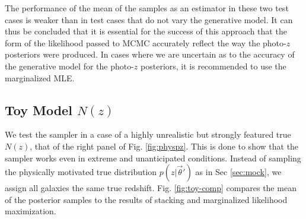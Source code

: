\documentclass[preprint]{aastex}
\begin{document}
The performance of the mean of the samples as an estimator in these two test 
cases is weaker than in test cases that do not vary the generative model.  It 
can thus be concluded that it is essential for the success of this approach 
that the form of the likelihood passed to MCMC accurately reflect the way the 
photo-$z$ posteriors were produced.  In cases where we are uncertain as to the 
accuracy of the generative model for the photo-$z$ posteriors, it is 
recommended to use the marginalized MLE.

\subsection{Toy Model $N(z)$}
\label{sec:fake}

We test the sampler in a case of a highly unrealistic but strongly featured 
true $N(z)$, that of the right panel of Fig. \ref{fig:physpz}.  This is done to 
show that the sampler works even in extreme and unanticipated conditions.  
Instead of sampling the physically motivated true distribution 
$p(z|\vec{\theta}')$ as in Sec \ref{sec:mock}, we assign all galaxies the same 
true redshift.  Fig. \ref{fig:toy-comp} compares the mean of the posterior 
samples to the results of stacking and marginalized likelihood maximization.    

\end{document}
